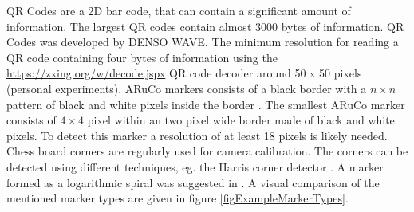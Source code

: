 \documentclass{article}
\begin{document}
QR Codes are a 2D bar code, that can contain a significant amount of information. 
The largest QR codes contain almost 3000 bytes of information. 
QR Codes was developed by DENSO WAVE. 
The minimum resolution for reading a QR code containing four bytes of information using the \url{https://zxing.org/w/decode.jspx} QR code decoder around 50 x 50 pixels (personal experiments). 
ARuCo markers consists of a black border with a $n \times n$ pattern of black and white pixels inside the border \cite{Garrido-Jurado2014}. 
The smallest ARuCo marker consists of $4 \times 4$ pixel within an two pixel wide border made of black and white pixels. 
To detect this marker a resolution of at least 18 pixels is likely needed. 
Chess board corners are regularly used for camera calibration. 
The corners can be detected using different techniques, eg. the Harris corner detector \cite{Harris1988}. 
A marker formed as a logarithmic spiral was suggested in \cite{Karlsson2011}. 
A visual comparison of the mentioned marker types are given 
in figure \ref{figExampleMarkerTypes}. 
 
\end{document}
